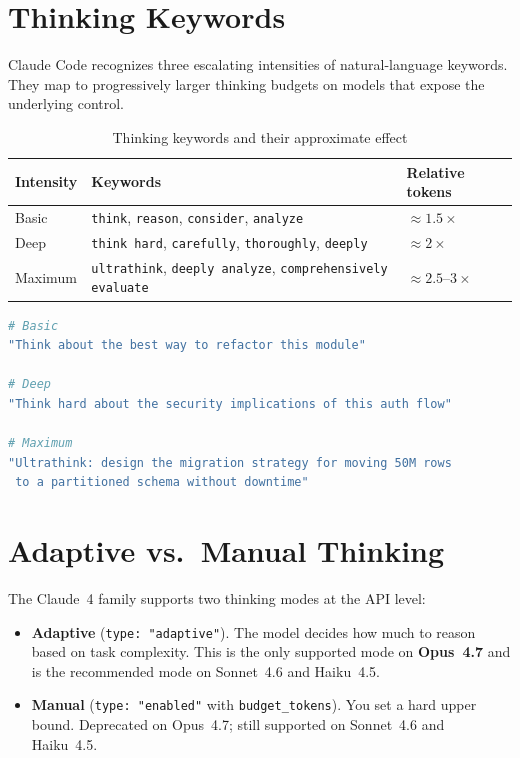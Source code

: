 \section{Thinking Keywords}
\label{sec:thinking-keywords}


Claude Code recognizes three escalating intensities of natural-language
keywords. They map to progressively larger thinking budgets on models that
expose the underlying control.

\begin{table}[ht]
\centering
\caption{Thinking keywords and their approximate effect}
\label{tab:thinking-keywords}
\begin{tabularx}{\textwidth}{lXX}
\toprule
\textbf{Intensity} & \textbf{Keywords} & \textbf{Relative tokens} \\
\midrule
Basic   & \texttt{think}, \texttt{reason}, \texttt{consider}, \texttt{analyze}
        & $\approx 1.5\times$ \\
Deep    & \texttt{think hard}, \texttt{carefully}, \texttt{thoroughly}, \texttt{deeply}
        & $\approx 2\times$ \\
Maximum & \texttt{ultrathink}, \texttt{deeply analyze}, \texttt{comprehensively evaluate}
        & $\approx 2.5\text{--}3\times$ \\
\bottomrule
\end{tabularx}
\end{table}

\begin{lstlisting}[language=bash,caption={Sample prompts at each intensity}]
# Basic
"Think about the best way to refactor this module"

# Deep
"Think hard about the security implications of this auth flow"

# Maximum
"Ultrathink: design the migration strategy for moving 50M rows
 to a partitioned schema without downtime"
\end{lstlisting}

\section{Adaptive vs.\ Manual Thinking}
\label{sec:thinking-adaptive}


The Claude~4 family supports two thinking modes at the API level:

\begin{itemize}
  \item \textbf{Adaptive} (\texttt{type: "adaptive"}). The model decides
        how much to reason based on task complexity. This is the only
        supported mode on \textbf{Opus~4.7} and is the recommended mode on
        Sonnet~4.6 and Haiku~4.5.
  \item \textbf{Manual} (\texttt{type: "enabled"} with
        \texttt{budget\_tokens}). You set a hard upper bound. Deprecated on
        Opus~4.7; still supported on Sonnet~4.6 and Haiku~4.5.
\end{itemize}

